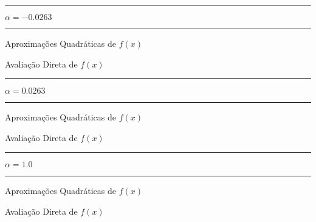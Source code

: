     {\centering
    \hrule
    \vspace{2mm}
    $\alpha = -0.0263$
    \vspace{2mm}
    \noindent
    \hrule 
    \vspace{2mm}}
      
    \begin{minipage}[h!]{\linewidth}
        \centering
        Aproximações Quadráticas de $f(x)$
        \label{tab:tbli} 
        \writetable{\tbli}\par
        \bigskip
        \centering
        Avaliação Direta de $f(x)$
        \label{tab:tblj} 
        \writetable{\tblj}
    \end{minipage}
    \vspace{3mm}

    {\centering
    \hrule
    \vspace{2mm}
    $\alpha = 0.0263$
    \vspace{2mm}
    \noindent
    \hrule 
    \vspace{2mm}}
    
    \begin{minipage}[h!]{\linewidth}
        \centering
        {Aproximações Quadráticas de $f(x)$}
        \label{tab:tblk} 
        \writetable{\tblk}\par
        \bigskip
        \centering
        {Avaliação Direta de $f(x)$}
        \label{tab:tbll} 
        \writetable{\tbll}
    \end{minipage}
    \vspace{3mm}

    {\centering
    \hrule
    \vspace{2mm}
    $\alpha = 1.0$
    \vspace{2mm}
    \noindent
    \hrule 
    \vspace{2mm}}
    
    \begin{minipage}[h!]{\linewidth}
        \centering
        {Aproximações Quadráticas de $f(x)$}
        \label{tab:tblm} 
        \writetable{\tblm}\par
        \bigskip
        \centering
        {Avaliação Direta de $f(x)$}
        \label{tab:tbln} 
        \writetable{\tbln}     
    \end{minipage}
    \vspace{3mm}
         
\newpage    